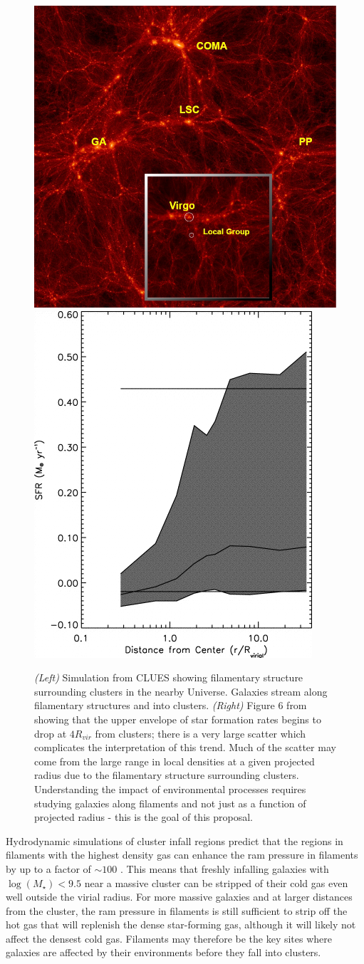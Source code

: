 \documentclass[11pt, preprint]{aastex}
\begin{document}
 \begin{figure}[h]
   \centering
 \includegraphics[width=.48\textwidth]{CLUES-DM.png}
\includegraphics[width=.39\textwidth]{gomez2003-fg6a.png}
   \caption{\small  {\it (Left) } Simulation from CLUES showing
     filamentary structure surrounding clusters in the nearby
     Universe.  Galaxies stream along filamentary structures and into clusters.
{\it (Right)}  Figure 6 from \citet{gomez03} showing that the upper
envelope of star formation rates begins to drop at $4R_{vir}$ from clusters;  there is a very
large scatter which complicates the interpretation of this trend.   Much
of the scatter may come from the large range in local densities at a given
projected radius due to the filamentary structure surrounding clusters.
Understanding the impact of environmental processes requires studying galaxies along
filaments and not just as a function of projected radius - this is the goal of this proposal.}
     \label{fig1}
 \end{figure}

Hydrodynamic simulations of cluster infall regions predict that
the regions in filaments with the highest density gas can enhance the ram pressure in
filaments by up to a factor of $\sim 100$ \citep{bahe13}.  This 
means that freshly infalling galaxies with $\log(M_\star)<9.5$ near a massive
cluster can be stripped of their cold gas even well outside the virial
radius.  For more massive galaxies and at larger distances from the
cluster, the ram pressure in filaments is still sufficient to strip
off the hot gas that will replenish the dense star-forming gas,
although it will likely not affect the densest cold gas.  
Filaments may therefore be the key
sites where galaxies are affected by their environments before they fall into
clusters. 
\end{document}
